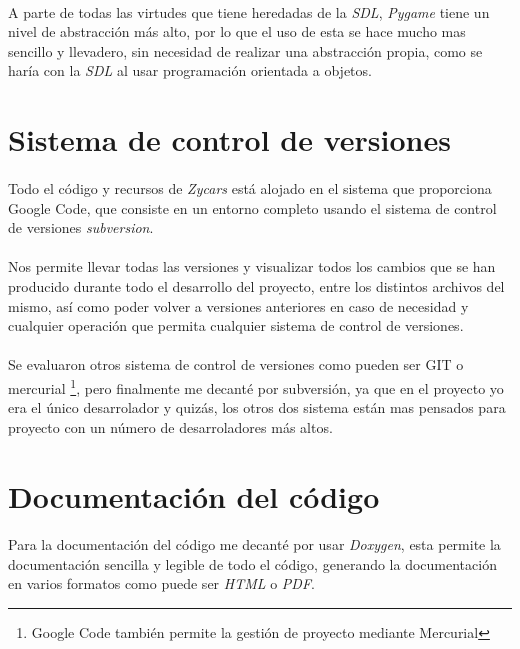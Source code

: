 \paragraph{}
A parte de todas las virtudes que tiene heredadas de la \emph{SDL}, \emph{Pygame} tiene un nivel de abstracción más alto, por lo que
el uso de esta se hace mucho mas sencillo y llevadero, sin necesidad de realizar una abstracción propia, como se haría con la 
\emph{SDL} al usar programación orientada a objetos.

\section{Sistema de control de versiones}

\paragraph{}
Todo el código y recursos de \emph{Zycars} está alojado en el sistema que proporciona Google Code, que consiste en un entorno completo
usando el sistema de control de versiones \emph{subversion}.

\paragraph{}
Nos permite llevar todas las versiones y visualizar todos los cambios que se han producido durante todo el desarrollo del proyecto,
entre los distintos archivos del mismo, así como poder volver a versiones anteriores en caso de necesidad y cualquier operación
que permita cualquier sistema de control de versiones.

\paragraph{}
Se evaluaron otros sistema de control de versiones como pueden ser GIT o mercurial \footnote{Google Code también permite la gestión
de proyecto mediante Mercurial}, pero finalmente me decanté por subversión, ya que en el proyecto yo era el único desarrolador y 
quizás, los otros dos sistema están mas pensados para proyecto con un número de desarroladores más altos.

\section{Documentación del código}

\paragraph{}
Para la documentación del código me decanté por usar \emph{Doxygen}, esta permite la documentación sencilla y legible de todo el 
código, generando la documentación en varios formatos como puede ser \emph{HTML} o \emph{PDF}.

